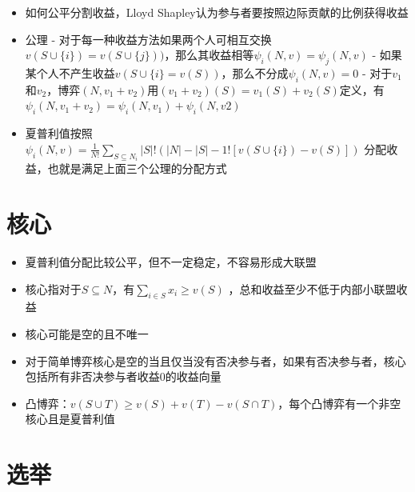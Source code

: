 \documentclass[
]{book}
\providecommand{\tightlist}{%
  \setlength{\itemsep}{0pt}\setlength{\parskip}{0pt}}
\begin{document}
\begin{itemize}
\item
  如何公平分割收益，Lloyd Shapley认为参与者要按照边际贡献的比例获得收益
\item
  公理
  - 对于每一种收益方法如果两个人可相互交换\(v(S\cup \{i\}) = v(S\cup \{j\}))\)，那么其收益相等\(\psi_i(N,v)=\psi_j(N,v)\)
  - 如果某个人不产生收益\(v(S\cup \{i\} = v(S))\)，那么不分成\(\psi_i(N,v)=0\)
  - 对于\(v_1\)和\(v_2\)，博弈\((N,v_1+v_2)\)用\((v_1+v_2)(S)=v_1(S)+v_2(S)\)定义，有\(\psi_i(N,v_1+v_2)=\psi_i(N,v_1)+\psi_i(N,v2)\)
\item
  夏普利值按照 \(\psi_i(N,v) = \frac{1}{N!}\sum_{S\subseteq N_i} |S|!(|N|-|S|-1![v(S\cup \{i\})-v(S)])\) 分配收益，也就是满足上面三个公理的分配方式
\end{itemize}

\hypertarget{ux6838ux5fc3}{%
\section{核心}\label{ux6838ux5fc3}}

\begin{itemize}
\tightlist
\item
  夏普利值分配比较公平，但不一定稳定，不容易形成大联盟
\item
  核心指对于\(S\subseteq N\)，有\(\sum_{i\in S} x_i \geq v(S)\) ，总和收益至少不低于内部小联盟收益
\item
  核心可能是空的且不唯一
\item
  对于简单博弈核心是空的当且仅当没有否决参与者，如果有否决参与者，核心包括所有非否决参与者收益0的收益向量
\item
  凸博弈：\(v(S\cup T)\geq v(S)+v(T)-v(S\cap T)\)，每个凸博弈有一个非空核心且是夏普利值
\end{itemize}

\hypertarget{ux9009ux4e3e}{%
\section{选举}\label{ux9009ux4e3e}}
\end{document}
